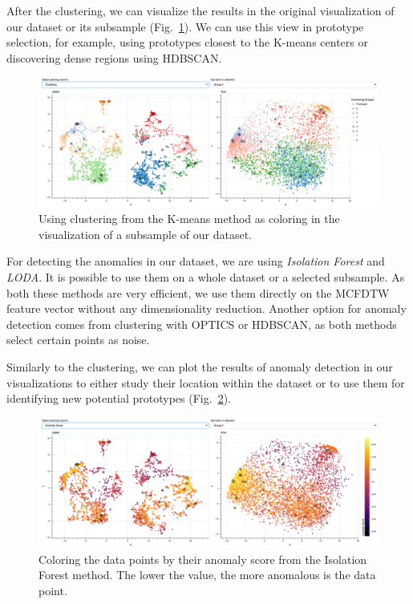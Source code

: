 After the clustering, we can visualize the results in the original visualization of our dataset or its subsample (Fig.~\ref{fig:coloring-cluster}). We can use this view in prototype selection, for example, using prototypes closest to the K-means centers or discovering dense regions using HDBSCAN.
\begin{figure}[h]
    \centering
    \includegraphics[width=\textwidth]{img/clustering.png}
    \caption{Using clustering from the K-means method as coloring in the visualization of a subsample of our dataset.}
    \label{fig:coloring-cluster}
\end{figure}

For detecting the anomalies in our dataset, we are using \textit{Isolation Forest} and \textit{LODA}. It is possible to use them on a whole dataset or a selected subsample. As both these methods are very efficient, we use them directly on the MCFDTW feature vector without any dimensionality reduction. Another option for anomaly detection comes from clustering with OPTICS or HDBSCAN, as both methods select certain points as noise.

Similarly to the clustering, we can plot the results of anomaly detection in our visualizations to either study their location within the dataset or to use them for identifying new potential prototypes (Fig.~\ref{fig:anomaly-detection}).
\begin{figure}[h]
    \centering
    \includegraphics[width=\textwidth]{img/anomaly_detection.png}
    \caption{Coloring the data points by their anomaly score from the Isolation Forest method. The lower the value, the more anomalous is the data point.}
    \label{fig:anomaly-detection}
\end{figure}

